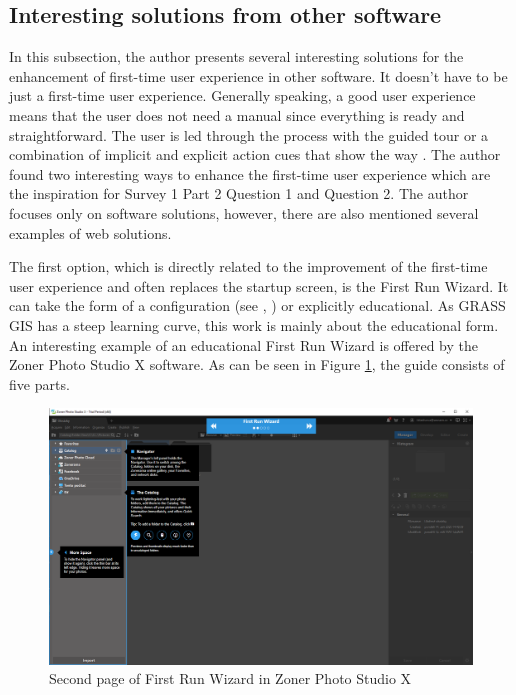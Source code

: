 \documentclass[a4paper,10pt,twoside]{article}
\begin{document}
\newpage
\vspace*{-1cm}
\subsection{Interesting solutions from other software}
\label{sec:other_software}

In this subsection, the author presents several interesting solutions for the enhancement of first-time user experience in other software. It doesn't have to be just a first-time user experience. Generally speaking, a good user experience means that the user does not need a manual since everything is ready and straightforward. The user is led through the process with the guided tour or a combination of implicit and explicit action cues that show the way \cite{ftue2}. The author found two interesting ways to enhance the first-time user experience which are the inspiration for Survey 1 Part 2 Question 1 and Question 2. The author focuses only on software solutions, however, there are also mentioned several examples of web solutions.

The first option, which is directly related to the improvement of the first-time user experience and often replaces the startup screen, is the First Run Wizard. It can take the form of a configuration (see \cite{lansweeper}, \cite{jetbrains}) or explicitly educational. As GRASS GIS has a steep learning curve, this work is mainly about the educational form. An interesting example of an educational First Run Wizard is offered by the Zoner Photo Studio X software. As can be seen in Figure \ref{fig:zoner}, the guide consists of five parts.

\vspace{0.3cm}
\begin{figure}[hbt!] 
\begin{center}
\includegraphics[width=17cm]{../pictures/zoner_first_run_2.png} 
\caption[Second page of First Run Wizard in Zoner Photo Studio X]{Second page of First Run Wizard in Zoner Photo Studio X}
\label{fig:zoner}
\end{center}
\end{figure}
\end{document}
